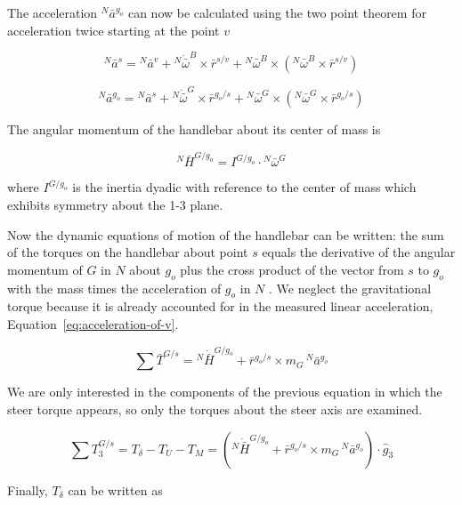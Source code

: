\documentclass[a4paper]{article}
\begin{document}
The acceleration $^N\bar{a}^{g_o}$ can now be calculated using the two point
theorem for acceleration \cite{Kane1985} twice starting at the point $v$

\begin{equation}
  ^N\bar{a}^s = {}^N\bar{a}^v +
    {}^N\dot{\bar{\omega}}^B\times\bar{r}^{s/v} +
    {}^N\bar{\omega}^B\times({}^N\bar{\omega}^B\times\bar{r}^{s/v})
\end{equation}

\begin{equation}
  ^N\bar{a}^{g_o} = {}^N\bar{a}^s +
    {}^N\dot{\bar{\omega}}^G\times\bar{r}^{g_o/s} +
    {}^N\bar{\omega}^G\times({}^N\bar{\omega}^G\times\bar{r}^{g_o/s})
\end{equation}

The angular momentum of the handlebar about its center of mass is

\begin{equation}
  ^N\bar{H}^{G/g_o} = I^{G/g_o} \cdot {}^N\bar{\omega}^G
\end{equation}

where $I^{G/g_o}$ is the inertia dyadic with reference to the center of mass
which exhibits symmetry about the 1-3 plane.

Now the dynamic equations of motion of the handlebar can be written: the sum of
the torques on the handlebar about point $s$ equals the derivative of the
angular momentum of $G$ in $N$ about $g_o$ plus the cross product of the vector
from $s$ to $g_o$ with the mass times the acceleration of $g_o$ in $N$
\cite{Meriam1975}. We neglect the gravitational torque because it is already
accounted for in the measured linear acceleration,
Equation~\ref{eq:acceleration-of-v}.

\begin{equation}
  \sum \bar{T}^{G/s} = {}^N\dot{\bar{H}}^{G/g_o} +
    \bar{r}^{g_o/s} \times m_G\,{}^N\bar{a}^{g_o}
\end{equation}

We are only interested in the components of the previous equation in which the
steer torque appears, so only the torques about the steer axis are examined.

\begin{equation}
  \sum T^{G/s}_3 = T_\delta - T_U - T_M = \left({}^N\dot{\bar{H}}^{G/g_o} +
  \bar{r}^{g_o/s} \times m_G\,{}^N\bar{a}^{g_o}\right) \cdot \hat{g}_3
\end{equation}

Finally, $T_\delta$ can be written as
\end{document}
